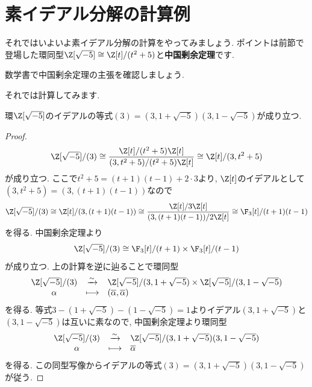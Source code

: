 \documentclass[11pt,b5paper,oneside,titlepage,lualatex]{ltjsreport}
\begin{document}
\section{素イデアル分解の計算例} \label{sec:素イデアル分解の計算例}


それではいよいよ素イデアル分解の計算をやってみましょう. 
ポイントは前節で登場した環同型$ \Z[\sqrt{-5}] \cong \Z[t]/(t^2 + 5) $と\textbf{中国剰余定理}です. 

\begin{exc}{}{}
	数学書で中国剰余定理の主張を確認しましょう. 
\end{exc}

それでは計算してみます. 

\begin{prop}{}{}
	環$ \Z[\sqrt{-5}] $のイデアルの等式$ (3) = (3, 1 + \sqrt{-5}) (3, 1 - \sqrt{-5}) $が成り立つ. 
\end{prop}

\begin{proof}
	\[
	\Z[\sqrt{-5}]/(3) \cong \frac{\Z[t]/(t^2 + 5) \Z[t]}{(3, t^2+5)/(t^2 + 5) \Z[t]}
	\cong \Z[t]/(3, t^2+5)
	\]
	が成り立つ. 
	ここで$ t^2 + 5 = (t+1)(t-1) + 2 \cdot 3 $より, $ \Z[t] $のイデアルとして$ (3, t^2+5) = (3, (t+1)(t-1)) $なので
	\[
	\Z[\sqrt{-5}]/(3) \cong \Z[t]/(3, (t+1)(t-1))
	\cong \frac{\Z[t]/3\Z[t]}{(3, (t+1)(t-1))/2\Z[t]}
	\cong \F_3[t]/(t+1)(t-1)
	\]
	を得る. 
	中国剰余定理より
	\[
	\Z[\sqrt{-5}]/(3) \cong \F_3[t]/(t+1) \times \F_3[t]/(t-1)
	\]
	が成り立つ. 
	上の計算を逆に辿ることで環同型
	\[
	\begin{array}{ccl}
		\Z[\sqrt{-5}]/(3) & \xrightarrow{\sim} & \Z[\sqrt{-5}]/(3, 1 + \sqrt{-5}) \times \Z[\sqrt{-5}]/(3, 1 - \sqrt{-5}) \\
		\alpha & \longmapsto & (\overline{\alpha}, \overline{\alpha})
	\end{array}
	\]
	を得る. 
	等式$ 3 - (1 + \sqrt{-5}) - (1 - \sqrt{-5}) = 1 $よりイデアル$ (3, 1 + \sqrt{-5}) $と$ (3, 1 - \sqrt{-5}) $は互いに素なので, 中国剰余定理より環同型
	\[
	\begin{array}{ccl}
		\Z[\sqrt{-5}]/(3) & \xrightarrow{\sim} & \Z[\sqrt{-5}]/(3, 1 + \sqrt{-5})(3, 1 - \sqrt{-5}) \\
		\alpha & \longmapsto & \overline{\alpha}
	\end{array}
	\]
	を得る. 
	この同型写像からイデアルの等式$ (3) = (3, 1 + \sqrt{-5}) (3, 1 - \sqrt{-5}) $が従う. 
\end{proof}
\end{document}
